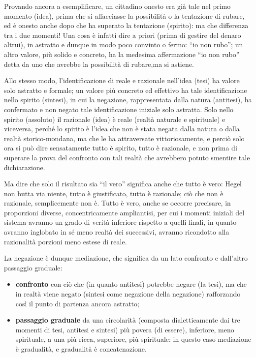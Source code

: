 \documentclass[a4paper,12pt,oneside,openany]{book}%
\begin{document}
Provando ancora a esemplificare, un cittadino onesto era già tale nel primo momento (idea), prima che si affacciasse la possibilità o la tentazione di rubare, ed è onesto anche dopo che ha superato la tentazione (spirito): ma che differenza tra i due momenti! Una cosa è infatti dire a priori (prima di gestire del denaro altrui), in astratto e dunque in modo poco convinto o fermo: “io non rubo”; un altro valore, più solido e concreto, ha la medesima affermazione “io non rubo” detta da uno che avrebbe la possibilità di rubare,ma si astiene.

Allo stesso modo, l’identificazione di reale e razionale nell’idea (tesi) ha valore solo astratto e formale; un valore più concreto ed effettivo ha tale identificazione nello spirito (sintesi), in cui la negazione, rappresentata dalla natura (antitesi), ha confermato e non negato tale identificazione iniziale solo astratta. Solo nello spirito (assoluto) il razionale (idea) è reale (realtà naturale e spirituale) e viceversa, perché lo spirito è l’idea che non è stata negata dalla natura o dalla realtà storico-mondana, ma che le ha attraversate vittoriosamente, e perciò solo ora si può dire sensatamente tutto è spirito, tutto è razionale, e non prima di superare la prova del confronto con tali realtà che avrebbero potuto smentire tale dichiarazione.

Ma dire che solo il risultato sia “il vero” significa anche che tutto è vero: Hegel non butta via niente, tutto è giustificato, tutto è razionale; ciò che non è razionale, semplicemente non è. Tutto è vero, anche se occorre precisare, in proporzioni diverse, concentricamente ampliantisi, per cui i momenti iniziali del sistema avranno un grado di verità inferiore rispetto a quelli finali, in quanto avranno inglobato in sé meno realtà dei successivi, avranno ricondotto alla razionalità porzioni meno estese di reale.

La negazione è dunque mediazione, che significa da un lato confronto e dall’altro passaggio graduale:

\begin{itemize}
	\item \textbf{confronto} con ciò che (in quanto antitesi) potrebbe negare (la tesi), ma che in realtà viene negato (sintesi come negazione della negazione) rafforzando così il punto di partenza ancora astratto;
	\item \textbf{passaggio graduale} da una circolarità (composta dialetticamente dai tre momenti di tesi, antitesi e sintesi) più povera (di essere), inferiore, meno spirituale, a una più ricca, superiore, più spirituale: in questo caso mediazione è gradualità, e gradualità è concatenazione.
\end{itemize}
\end{document}
